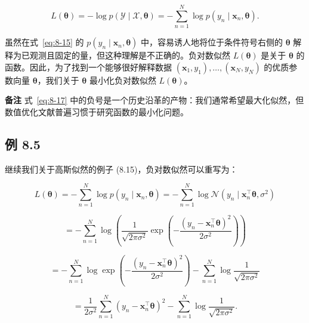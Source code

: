 \begin{equation}
L(\boldsymbol{\theta}) = -\log p(\mathcal{Y} \mid \mathcal{X}, \boldsymbol{\theta}) = -\sum_{n=1}^N \log p(y_n \mid \boldsymbol{x}_n, \boldsymbol{\theta}) .
\tag{8.17}\label{eq:8-17}
\end{equation}

虽然在式~\eqref{eq:8-15} 的 $ p(y_n \mid \boldsymbol{x}_n, \boldsymbol{\theta}) $ 中，容易诱人地将位于条件符号右侧的 $ \boldsymbol{\theta} $ 解释为已观测且固定的量，但这种理解是不正确的。负对数似然 $ L(\boldsymbol{\theta}) $ 是关于 $ \boldsymbol{\theta} $ 的函数。因此，为了找到一个能够很好解释数据 $ (\boldsymbol{x}_1, y_1), \ldots, (\boldsymbol{x}_N, y_N) $ 的优质参数向量 $ \boldsymbol{\theta} $，我们关于 $ \boldsymbol{\theta} $ 最小化负对数似然 $ L(\boldsymbol{\theta}) $。

\begin{notebox}
\textbf{备注} 式~\eqref{eq:8-17} 中的负号是一个历史沿革的产物：我们通常希望最大化似然，但数值优化文献普遍习惯于研究函数的最小化问题。
\end{notebox}

\subsection*{例 8.5}

继续我们关于高斯似然的例子 (8.15)，负对数似然可以重写为：

\begin{equation}
L(\boldsymbol{\theta}) = -\sum_{n=1}^N \log p(y_n \mid \boldsymbol{x}_n, \boldsymbol{\theta}) = -\sum_{n=1}^N \log \mathcal{N}\left(y_n \mid \boldsymbol{x}_n^\top \boldsymbol{\theta}, \sigma^2\right)
\tag{8.18a}\label{eq:8-18a}
\end{equation}

\begin{equation}
= -\sum_{n=1}^N \log \left( \frac{1}{\sqrt{2\pi\sigma^2}} \exp\left( -\frac{(y_n - \boldsymbol{x}_n^\top \boldsymbol{\theta})^2}{2\sigma^2} \right) \right)
\tag{8.18b}\label{eq:8-18b}
\end{equation}

\begin{equation}
= -\sum_{n=1}^N \log \exp\left( -\frac{(y_n - \boldsymbol{x}_n^\top \boldsymbol{\theta})^2}{2\sigma^2} \right) - \sum_{n=1}^N \log \frac{1}{\sqrt{2\pi\sigma^2}}
\tag{8.18c}\label{eq:8-18c}
\end{equation}

\begin{equation}
= \frac{1}{2\sigma^2} \sum_{n=1}^N (y_n - \boldsymbol{x}_n^\top \boldsymbol{\theta})^2 - \sum_{n=1}^N \log \frac{1}{\sqrt{2\pi\sigma^2}} .
\tag{8.18d}\label{eq:8-18d}
\end{equation}

